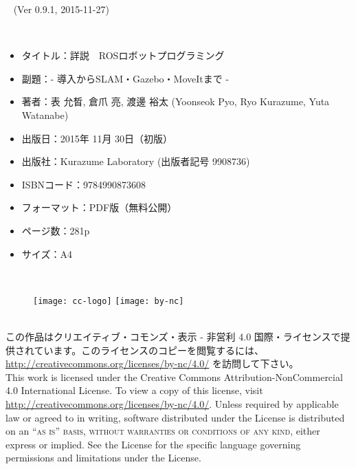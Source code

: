 \documentclass[11pt,fleqn]{book} %
\begin{document}
\begingroup
\thispagestyle{empty}

\centering
~\vfill
\large{(Ver 0.9.1, 2015-11-27)} \\ %
\endgroup

\newpage
\thispagestyle{empty}

\noindent{\LARGE [本の紹介]}\\
\normalsize
\begin{itemize}[leftmargin=*]
\item タイトル：詳説　ROSロボットプログラミング
\item 副題：- 導入からSLAM・Gazebo・MoveItまで -
\item 著者：表 允晳, 倉爪 亮, 渡邊 裕太 (Yoonseok Pyo, Ryo Kurazume, Yuta Watanabe)
\item 出版日：2015年 11月 30日（初版）
\item 出版社：Kurazume Laboratory (出版者記号 9908736)
\item ISBNコード：9784990873608
\item フォーマット：PDF版（無料公開）
\item ページ数：281p
\item サイズ：A4
\end{itemize}
\vspace*{1cm}


\noindent{\LARGE [ライセンス]}\\
\begin{figure}[htp]
\centering
\texttt{[image: cc-logo]}
\hspace{10pt}
\texttt{[image: by-nc]}
\end{figure}
\normalsize\\
\noindent この作品はクリエイティブ・コモンズ・表示 - 非営利 4.0 国際・ライセンスで提供されています。このライセンスのコピーを閲覧するには、 \url{http://creativecommons.org/licenses/by-nc/4.0/} を訪問して下さい。\\

\noindent This work is licensed under the Creative Commons Attribution-NonCommercial 4.0 International License. To view a copy of this license, visit \url{http://creativecommons.org/licenses/by-nc/4.0/}. Unless required by applicable law or agreed to in writing, software distributed under the License is distributed on an \textsc{``as is'' basis, without warranties or conditions of any kind}, either express or implied. See the License for the specific language governing permissions and limitations under the License.\\ %
\end{document}
